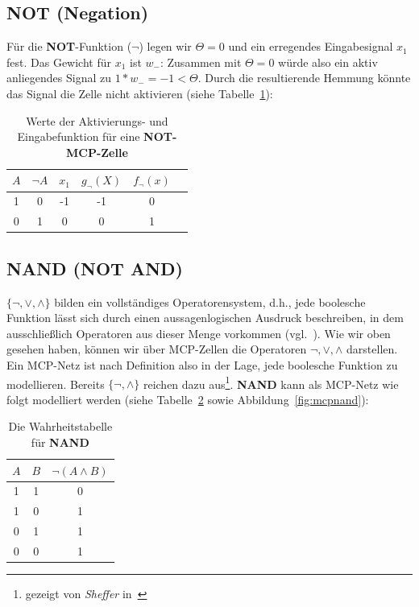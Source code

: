 {\subsection*{NOT (Negation)}

Für die \textbf{NOT}-Funktion ($\neg$) legen wir $\Theta = 0$ und ein erregendes Eingabesignal $x_1$ fest.
Das Gewicht für $x_1$ ist $w_-$: Zusammen mit $\Theta = 0$ würde also ein aktiv anliegendes Signal zu $1 * w_-=-1 < \Theta$.
Durch die resultierende Hemmung könnte das Signal die Zelle nicht aktivieren (siehe Tabelle~\ref{tab:mcp-neg}):


\begin{table} %
    \centering
    \begin{tabular}{c | c | c |c | c | c}
        $A$ & $\neg A$ & $x_1$ & $g_{\neg}(X)$ & $f_{\neg}(x)$  \\
        \hline
         1   & 0        & -1     &  -1             & 0             \\
         0   & 1        & 0     &  0             &  1             \\
    \end{tabular}
    \caption{Werte der Aktivierungs- und Eingabefunktion für eine \textbf{NOT-MCP-Zelle}}
    \label{tab:mcp-neg}
\end{table}


\subsection*{NAND (NOT AND)}

$\{\neg, \lor, \land\}$ bilden ein vollständiges Operatorensystem, d.h., jede boolesche Funktion lässt sich durch einen aussagenlogischen Ausdruck  beschreiben, in dem ausschließlich Operatoren aus dieser Menge vorkommen (vgl.~\cite[89]{Hof22}).
Wie wir oben gesehen haben, können wir über MCP-Zellen die Operatoren $\neg, \lor, \land$ darstellen.
Ein MCP-Netz ist nach Definition also in der Lage, jede boolesche Funktion zu modellieren.
Bereits $\{\neg, \land\}$ reichen dazu aus\footnote{gezeigt von \textit{Sheffer} in~\cite{She13}}. \textbf{NAND} kann als MCP-Netz wie folgt modelliert werden (siehe Tabelle~\ref{tab:nand} sowie Abbildung~\ref{fig:mcpnand}):

\begin{table} %
    \centering
    \begin{tabular}{c | c | c}
        $A$ & $B$ & $\neg(A \land B)$ \\
        \hline
        1   & 1   & 0           \\
        1   & 0   & 1           \\
        0   & 1   & 1           \\
        0   & 0   & 1           \\
    \end{tabular}
    \caption{Die Wahrheitstabelle für \textbf{NAND}}
    \label{tab:nand}
\end{table}


}
